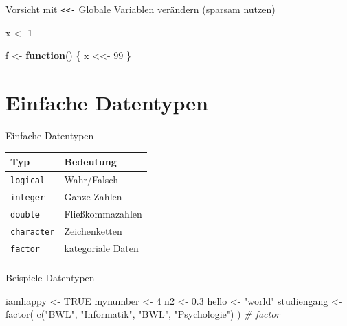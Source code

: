 \documentclass[
  10pt,
  ignorenonframetext,
  aspectratio=169,
]{beamer}
\newenvironment{Shaded}{}{}
\newcommand{\CommentTok}[1]{\textcolor[rgb]{0.38,0.63,0.69}{\textit{#1}}}
\newcommand{\ConstantTok}[1]{\textcolor[rgb]{0.53,0.00,0.00}{#1}}
\newcommand{\ControlFlowTok}[1]{\textcolor[rgb]{0.00,0.44,0.13}{\textbf{#1}}}
\newcommand{\DecValTok}[1]{\textcolor[rgb]{0.25,0.63,0.44}{#1}}
\newcommand{\FloatTok}[1]{\textcolor[rgb]{0.25,0.63,0.44}{#1}}
\newcommand{\FunctionTok}[1]{\textcolor[rgb]{0.02,0.16,0.49}{#1}}
\newcommand{\NormalTok}[1]{#1}
\newcommand{\OtherTok}[1]{\textcolor[rgb]{0.00,0.44,0.13}{#1}}
\newcommand{\StringTok}[1]{\textcolor[rgb]{0.25,0.44,0.63}{#1}}
\begin{document}
\begin{frame}[fragile]{Vorsicht mit \texttt{\textless{}\textless{}-}}
\label{vorsicht-mit--}
Globale Variablen verändern (sparsam nutzen)

\begin{Shaded}
\begin{Highlighting}[]
\NormalTok{x }\OtherTok{\textless{}{-}} \DecValTok{1}

\NormalTok{f }\OtherTok{\textless{}{-}} \ControlFlowTok{function}\NormalTok{() \{}
\NormalTok{  x }\OtherTok{\textless{}\textless{}{-}} \DecValTok{99}
\NormalTok{\}}
\end{Highlighting}
\end{Shaded}
\end{frame}

\section{Einfache Datentypen}\label{einfache-datentypen}

\begin{frame}[fragile]{Einfache Datentypen}
\label{einfache-datentypen-1}
\begin{longtable}[]{@{}ll@{}}
\toprule\noalign{}
Typ & Bedeutung \\
\midrule\noalign{}
\endhead
\texttt{logical} & Wahr/Falsch \\
\texttt{integer} & Ganze Zahlen \\
\texttt{double} & Fließkommazahlen \\
\texttt{character} & Zeichenketten \\
\texttt{factor} & kategoriale Daten \\
\bottomrule\noalign{}
\end{longtable}
\end{frame}

\begin{frame}[fragile]{Beispiele Datentypen}
\label{beispiele-datentypen}
\begin{Shaded}
\begin{Highlighting}[]
\NormalTok{iamhappy }\OtherTok{\textless{}{-}} \ConstantTok{TRUE}
\NormalTok{mynumber }\OtherTok{\textless{}{-}} \DecValTok{4}
\NormalTok{n2 }\OtherTok{\textless{}{-}} \FloatTok{0.3}
\NormalTok{hello }\OtherTok{\textless{}{-}} \StringTok{"world"}
\NormalTok{studiengang }\OtherTok{\textless{}{-}} \FunctionTok{factor}\NormalTok{(}
  \FunctionTok{c}\NormalTok{(}\StringTok{"BWL"}\NormalTok{, }\StringTok{"Informatik"}\NormalTok{, }\StringTok{"BWL"}\NormalTok{, }\StringTok{"Psychologie"}\NormalTok{)}
\NormalTok{)                         }\CommentTok{\# factor}
\end{Highlighting}
\end{Shaded}
\end{frame}
\end{document}
